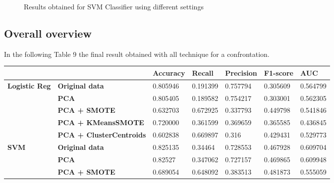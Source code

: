 \documentclass{article}
\begin{document}
\begin{figure}[H]
\centering

\caption{Results obtained for SVM Classifier using different settings}
\end{figure}


\subsection{Overall overview}
In the following Table 9 the final result obtained with all technique for a confrontation.

\begin{table}[H]
\begin{tabular}{lllllll}
                                                 &                                               & \textbf{Accuracy} & \textbf{Recall} & \textbf{Precision} & \textbf{F1-score} & \textbf{AUC} \\ \hline
\multirow{5}{*}{\textbf{Logistic Reg}}    & \textbf{Original data}                        & 0.805946          & 0.191399        & 0.757794           & 0.305609          & 0.564799     \\
                                                 & \textbf{PCA}                                  & 0.805405          & 0.189582        & 0.754217           & 0.303001          & 0.562305     \\
                                                 & \textbf{PCA + SMOTE }             & 0.632703          & 0.672925        & 0.337793           & 0.449798          & 0.541846     \\
                                                 & \textbf{PCA + KMeansSMOTE }       & 0.720000              & 0.361599        & 0.369659           & 0.365585          & 0.436845     \\ 
                                                 & \textbf{PCA + ClusterCentroids } & 0.602838          & 0.669897        & 0.316              & 0.429431          & 0.529773     \\ \hline
\multirow{5}{*}{\textbf{SVM}} & \textbf{Original data}                        & 0.825135          & 0.34464         & 0.728553           & 0.467928          & 0.609704     \\ 
                                                 & \textbf{PCA}                                  & 0.82527           & 0.347062        & 0.727157           & 0.469865          & 0.609948     \\
                                                 & \textbf{PCA + SMOTE }             & 0.689054          & 0.648092        & 0.383513           & 0.481873          & 0.555059     \\

\end{tabular}
\end{table}
\end{document}
